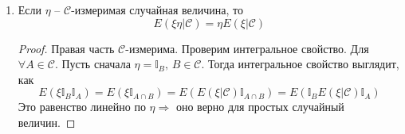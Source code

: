 \begin{enumerate}
	      \begin{enumerate}
		      \item Если $0 \leq \xi_n \uparrow \xi$, то
		            \[E(\xi_n | \mathcal{C}) \stackrel{\text{п.н.}}{\uparrow} E(\xi | \mathcal{C})\]
		      \item Если $\xi_n \stackrel{\text{п.н.}}{\to} \xi$ и $\forall n \in \mathbb{N}:\: |\xi_n| \leq \eta$, где $E\eta < +\infty$, то
		            \[E(\xi_n | \mathcal{C}) \stackrel{\text{п.н.}}{\to} E(\xi | \mathcal{C})\]
	      \end{enumerate}
	      \begin{proof}
		      \begin{enumerate}
			      \item По свойству о сохранении относительного порядка:
			            \[0 \leq E(\xi_n | \mathcal{C}) \leq E(\xi_{n + 1} | \mathcal{C})\]
			            Обозначим $\eta = \lim_n E(\xi_n | \mathcal{C})$. Проверим, что $\eta$ -- $\mathcal{C}$-измеримая случайная величина, как предел $\mathcal{C}$-измеримых.

			            Проверим интегральное свойство, $\forall A \in \mathcal{C}$:
			            \[0 \leq \xi_n\mathbb{I}_A \uparrow \xi\mathbb{I}_A,\, 0 \leq E(\xi_n | \mathcal{C})\mathbb{I}_A \uparrow \eta\mathbb{I}_A\]
			            Тогда по теореме о монотонной сходимости
			            \[E(\xi\mathbb{I}_A) = \lim_{n \to +\infty} E(\xi_n\mathbb{I}_A) = \lim_{n \to +\infty} E(E(\xi_n | \mathcal{C})\mathbb{I}_A) = E(\eta\mathbb{I}_A)\]
			      \item Рассмотрим $\eta_n = \sup_{m \geq n}|\xi_m - \xi|$. Тогда $\eta_n \stackrel{\text{п.н.}}{\to} 0,\, |\eta_n| \leq 2\eta$:
			            \[|E(\xi_n | \mathcal{C}) - E(\xi | \mathcal{C})| \leq E(|\xi_n - \xi| | \mathcal{C}) \leq E(\eta_n | \mathcal{C})\]
			            По предыдущему свойству $E(\eta_n | \mathcal{C}) \stackrel{\text{п.н.}}{\to} 0$
		      \end{enumerate}
	      \end{proof}
	\item Если $\eta$ -- $\mathcal{C}$-измеримая случайная величина, то
	      \[E(\xi\eta | \mathcal{C}) = \eta E(\xi | \mathcal{C})\]
	      \begin{proof}
		      Правая часть $\mathcal{C}$-измерима. Проверим интегральное свойство. Для $\forall A \in \mathcal{C}$. Пусть сначала $\eta = \mathbb{I}_B,\, B \in \mathcal{C}$. Тогда интегральное свойство выглядит, как
		      \[E(\xi\mathbb{I}_B\mathbb{I}_A) = E(\xi \mathbb{I}_{A \cap B}) = E(E(\xi | \mathcal{C})\mathbb{I}_{A \cap B}) = E(\mathbb{I}_B E(\xi | \mathcal{C})\mathbb{I}_A)\]
		      Это равенство линейно по $\eta \Rightarrow$ оно верно для простых случайный величин.


\end{proof}
\end{enumerate}
